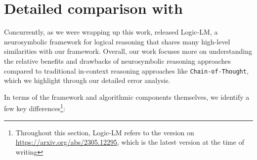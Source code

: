 \section{Detailed comparison with \citet{pan2023logic}} \label{sec:appendix-logiclm}
Concurrently, as we were wrapping up this work, \citet{pan2023logic} released Logic-LM, a neurosymbolic framework for logical reasoning that shares many high-level similarities with our framework.
Overall, our work focuses more on understanding the relative benefits and drawbacks of neurosymbolic reasoning approaches compared to traditional in-context reasoning approaches like \texttt{Chain-of-Thought}, which we highlight through our detailed error analysis.

In terms of the framework and algorithmic components themselves, we identify a few key differences\footnote{Throughout this section, Logic-LM refers to the version on \url{https://arxiv.org/abs/2305.12295}, which is the latest version at the time of writing}: 
